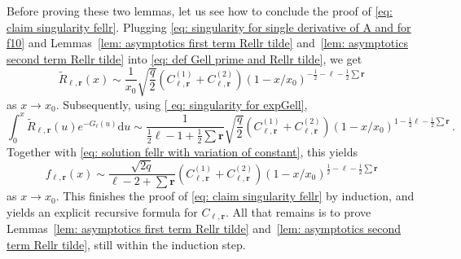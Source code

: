 \documentclass{article}
\theoremstyle{remark}
\newcommand{\cC}{\mathcal{C}}
\newcommand{\wR}{\widetilde{R}}
\newcommand{\br}{{\mathbf{r}}}
\begin{document}
Before proving these two lemmas, let us see how to conclude the proof of \eqref{eq: claim singularity fellr}.
Plugging \eqref{eq: singularity for single derivative of A and for f10} and Lemmas~\ref{lem: asymptotics first term Rellr tilde} and~\ref{lem: asymptotics second term Rellr tilde} into \eqref{eq: def Gell prime and Rellr tilde}, we get
\begin{equation*}
    \wR_{\ell,\br}(x) \sim
    \frac{1}{x_0} \sqrt{\frac{q}{2}} \left( C_{\ell,\br}^{(1)} + C_{\ell,\br}^{(2)} \right) (1-x/x_0)^{-\frac12 - \ell - \frac12 \sum \br}
\end{equation*}
as $x\to x_0$.
Subsequently, using \eqref{ eq: singularity for expGell},
\begin{equation*}
    \int_0^x \wR_{\ell,\br}(u) e^{-G_\ell(u)} \mathrm{d}u \sim
    \frac{1}{\frac12\ell - 1 + \frac12\sum \br} \sqrt{\frac{q}{2}} \left( C_{\ell,\br}^{(1)} + C_{\ell,\br}^{(2)} \right) (1-x/x_0)^{1 - \frac12\ell - \frac12 \sum \br} \,.
\end{equation*}
Together with \eqref{eq: solution fellr with variation of constant}, this yields
\begin{equation}\label{eq: recursive singularity for fellr}
    f_{\ell,\br}(x) \sim
    \frac{\sqrt{2q}}{\ell - 2 + \sum \br} \left( C_{\ell,\br}^{(1)} + C_{\ell,\br}^{(2)} \right) (1-x/x_0)^{\frac12 - \ell - \frac12 \sum \br} 
\end{equation}
as $x\to x_0$.
This finishes the proof of \eqref{eq: claim singularity fellr} by induction, and yields an explicit recursive formula for $C_{\ell,\br}$.
All that remains is to prove Lemmas~\ref{lem: asymptotics first term Rellr tilde} and~\ref{lem: asymptotics second term Rellr tilde}, still within the induction step.
\end{document}
